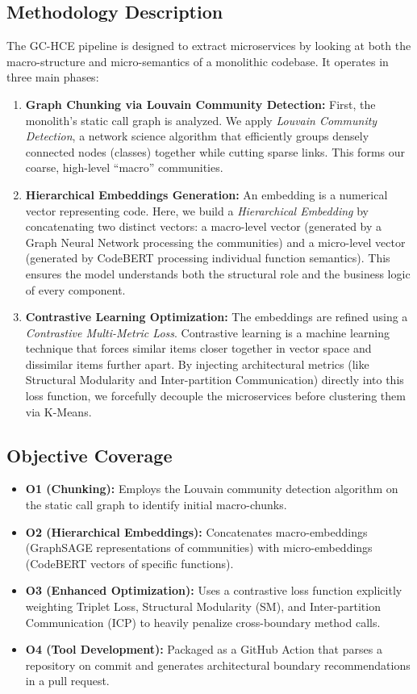 \documentclass[12pt, a4paper]{article}
\begin{document}
\subsection{Methodology Description}
The GC-HCE pipeline is designed to extract microservices by looking at both the macro-structure and micro-semantics of a monolithic codebase. It operates in three main phases:
\begin{enumerate}
    \item \textbf{Graph Chunking via Louvain Community Detection:} First, the monolith's static call graph is analyzed. We apply \textit{Louvain Community Detection}, a network science algorithm that efficiently groups densely connected nodes (classes) together while cutting sparse links. This forms our coarse, high-level ``macro'' communities.
    \item \textbf{Hierarchical Embeddings Generation:} An embedding is a numerical vector representing code. Here, we build a \textit{Hierarchical Embedding} by concatenating two distinct vectors: a macro-level vector (generated by a Graph Neural Network processing the communities) and a micro-level vector (generated by CodeBERT processing individual function semantics). This ensures the model understands both the structural role and the business logic of every component.
    \item \textbf{Contrastive Learning Optimization:} The embeddings are refined using a \textit{Contrastive Multi-Metric Loss}. Contrastive learning is a machine learning technique that forces similar items closer together in vector space and dissimilar items further apart. By injecting architectural metrics (like Structural Modularity and Inter-partition Communication) directly into this loss function, we forcefully decouple the microservices before clustering them via K-Means.
\end{enumerate}

\subsection{Objective Coverage}
\begin{itemize}
    \item \textbf{O1 (Chunking):} Employs the Louvain community detection algorithm on the static call graph to identify initial macro-chunks.
    \item \textbf{O2 (Hierarchical Embeddings):} Concatenates macro-embeddings (GraphSAGE representations of communities) with micro-embeddings (CodeBERT vectors of specific functions).
    \item \textbf{O3 (Enhanced Optimization):} Uses a contrastive loss function explicitly weighting Triplet Loss, Structural Modularity (SM), and Inter-partition Communication (ICP) to heavily penalize cross-boundary method calls.
    \item \textbf{O4 (Tool Development):} Packaged as a GitHub Action that parses a repository on commit and generates architectural boundary recommendations in a pull request.
\end{itemize}
\end{document}
